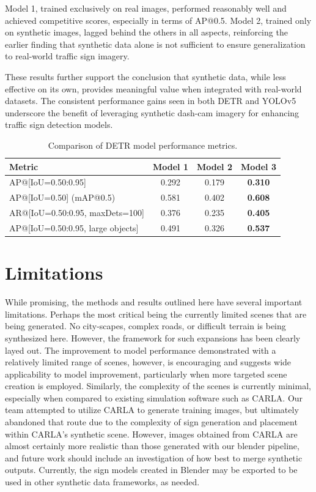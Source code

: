 \documentclass[journal]{IEEEtran}
\begin{document}
Model 1, trained exclusively on real images, performed reasonably well and achieved competitive scores, especially in terms of AP@0.5. Model 2, trained only on synthetic images, lagged behind the others in all aspects, reinforcing the earlier finding that synthetic data alone is not sufficient to ensure generalization to real-world traffic sign imagery.

These results further support the conclusion that synthetic data, while less effective on its own, provides meaningful value when integrated with real-world datasets. The consistent performance gains seen in both DETR and YOLOv5 underscore the benefit of leveraging synthetic dash-cam imagery for enhancing traffic sign detection models.

\begin{table}[ht]
\centering
\begin{tabular}{|l|c|c|c|}
\hline %
\textbf{Metric} & \textbf{Model 1} & \textbf{Model 2} & \textbf{Model 3} \\
\hline %
AP@[IoU=0.50:0.95] & 0.292 & 0.179 & \textbf{0.310} \\
AP@[IoU=0.50] (mAP@0.5) & 0.581 & 0.402 & \textbf{0.608} \\
AR@[IoU=0.50:0.95, maxDets=100] & 0.376 & 0.235 & \textbf{0.405}\\
AP@[IoU=0.50:0.95, large objects] & 0.491 & 0.326 & \textbf{0.537} \\
\hline %
\end{tabular}
\caption{Comparison of DETR model performance metrics.}
\label{tab:detr_model_comparison}
\end{table}
\section{Limitations}
While promising, the methods and results outlined here have several important limitations. Perhaps the most critical being the currently limited scenes that are being generated. No city-scapes, complex roads, or difficult terrain is being synthesized here. However, the framework for such expansions has been clearly layed out. The improvement to model performance demonstrated with a relatively limited range of scenes, however, is encouraging and suggests wide applicability to model improvement, particularly when more targeted scene creation is employed. Similarly, the complexity of the scenes is currently minimal, especially when compared to existing simulation software such as CARLA. Our team attempted to utilize CARLA to generate training images, but ultimately abandoned that route due to the complexity of sign generation and placement within CARLA's synthetic scene. However, images obtained from CARLA are almost certainly more realistic than those generated with our blender pipeline, and future work should include an investigation of how best to merge synthetic outputs. Currently, the sign models created in Blender may be exported to be used in other synthetic data frameworks, as needed.
\end{document}
